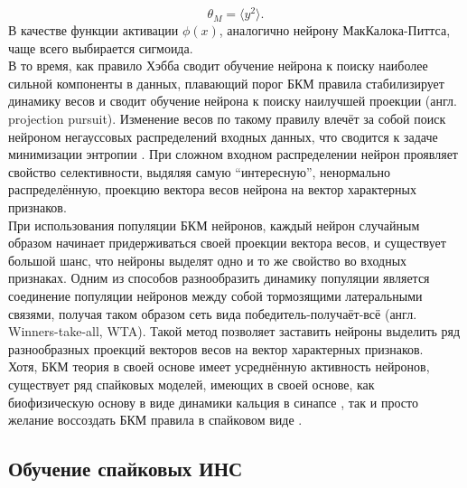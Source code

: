 \documentclass[a4paper,10pt]{article}
\begin{document}
\begin{equation*}
\theta_{M} = \langle y^2 \rangle.
\end{equation*}
\indent В качестве функции активации $\phi(x)$, аналогично нейрону МакКалока-Питтса, чаще всего выбирается сигмоида.\\ 
\indent В то время, как правило Хэбба сводит обучение нейрона к поиску наиболее сильной компоненты в данных, плавающий порог БКМ правила стабилизирует динамику весов и сводит обучение нейрона к поиску наилучшей проекции \cite{friedman1973projection} (англ. projection pursuit). Изменение весов по такому правилу влечёт за собой поиск нейроном негауссовых распределений входных данных, что сводится к задаче минимизации энтропии \cite{bcm_book}. При сложном входном распределении нейрон проявляет свойство селективности, выдяляя самую ``интересную'', ненормально распределённую, проекцию вектора весов нейрона на вектор характерных признаков.\\
\indent При использования популяции БКМ нейронов, каждый нейрон случайным образом начинает придерживаться своей проекции вектора весов, и существует большой шанс, что нейроны выделят одно и то же свойство во входных признаках. Одним из способов разнообразить динамику популяции является соединение популяции нейронов между собой тормозящими латеральными связями, получая таком образом сеть вида победитель-получаёт-всё (англ. Winners-take-all, WTA). Такой метод позволяет заставить нейроны выделить ряд разнообразных проекций векторов весов на вектор характерных признаков.\\
\indent Хотя, БКМ теория в своей основе имеет усреднённую активность нейронов, существует ряд спайковых моделей, имеющих в своей основе, как биофизическую основу в виде динамики кальция в синапсе \cite{ShouvalCaBCM}, так и просто желание воссоздать БКМ правила в спайковом виде \cite{PfisterTriple}.
\subsection{Обучение спайковых ИНС}
\end{document}
